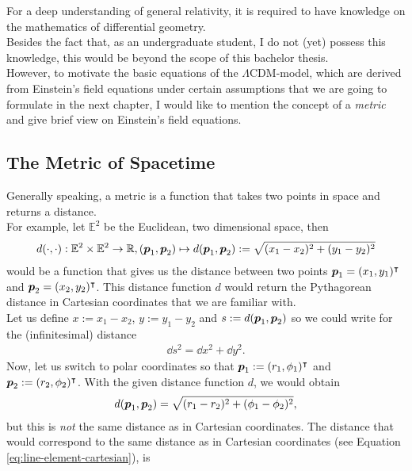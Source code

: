 \noindent For a deep understanding of general relativity, it is required to have knowledge on the mathematics of differential geometry. \\
\noindent Besides the fact that, as an undergraduate student, I do not (yet) possess this knowledge, this would be beyond the scope of this bachelor thesis. \\
\noindent However, to motivate the basic equations of the $\Lambda$CDM-model, which are derived from Einstein's field equations under certain assumptions that we are going to formulate in the next chapter, I would like to mention the concept of a \textit{metric} and give brief view on Einstein's field equations.

\subsection{The Metric of Spacetime}
Generally speaking, a metric is a function that takes two points in space and returns a distance. \\
For example, let $\mathbb{E}^2$ be the Euclidean, two dimensional space, then
\begin{align}
    d(\cdot, \cdot) : \mathbb{E}^{2} \times \mathbb{E}^{2} \to \mathbb{R}, (\vb*{p}_{1}, \vb*{p}_{2}) \mapsto d(\vb*{p}_{1}, \vb*{p}_{2}) := \sqrt{(x_{1} - x_{2})^2 + (y_{1} - y_{2})^2} 
\end{align}
would be a function that gives us the distance between two points $\vb*{p}_{1} = (x_{1}, y_{1})^{\intercal}$ and $\vb*{p}_{2} = (x_{2}, y_{2})^{\intercal}$. This distance function $d$ would return the Pythagorean distance in Cartesian coordinates that we are familiar with. \\
Let us define $x := x_{1} - x_{2}$, $y := y_{1} - y_{2}$ and $s := d(\vb*{p}_{1}, \vb*{p}_{2})$ so we could write for the (infinitesimal) distance 
\begin{align}
    \dd{s}^2 = \dd{x}^2 + \dd{y}^2. \label{eq:line-element-cartesian}
\end{align}
Now, let us switch to polar coordinates so that $\vb*{p}_{1} := (r_{1}, \phi_{1})^{\intercal}$ and $\vb*{p}_{2} := (r_{2}, \phi_{2})^{\intercal}$. With the given distance function $d$, we would obtain 
\begin{align}
    d(\vb*{p}_{1}, \vb*{p}_{2}) = \sqrt{(r_{1} - r_{2})^2 + (\phi_{1} - \phi_{2})^2}, 
\end{align}
but this is \textit{not} the same distance as in Cartesian coordinates. The distance that would correspond to the same distance as in Cartesian coordinates (see Equation \eqref{eq:line-element-cartesian}), is
